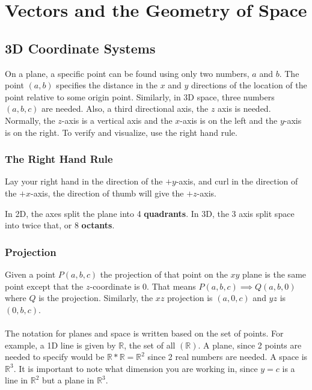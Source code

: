 \documentclass{article}
\begin{document}
\section{Vectors and the Geometry of Space}
\subsection{3D Coordinate Systems}
On a plane, a specific point can be found using only two numbers, $a$ and $b$. The point $(a,b)$ specifies the distance in the $x$ and $y$ directions of the location of the point relative to some origin point. Similarly, in 3D space, three numbers $(a,b,c)$ are needed. Also, a third directional axis, the $z$ axis is needed. Normally, the $z$-axis is a vertical axis and the $x$-axis is on the left and the $y$-axis is on the right. To verify and visualize, use the right hand rule.
\subsubsection{The Right Hand Rule}
Lay your right hand in the direction of the $+y$-axis, and curl in the direction of the $+x$-axis, the direction of thumb will give the $+z$-axis.

In 2D, the axes split the plane into 4 \textbf{quadrants}. In 3D, the 3 axis split space into twice that, or 8 \textbf{octants}.
\subsubsection{Projection}
Given a point $P(a,b,c)$ the projection of that point on the $xy$ plane is the same point except that the $z$-coordinate is 0. That means $P(a,b,c) \implies Q(a,b,0)$ where $Q$ is the projection. Similarly, the $xz$ projection is $(a,0,c)$ and $yz$ is $(0,b,c)$.\\\\
The notation for planes and space is written based on the set of points. For example, a 1D line is given by $\mathbb{R}$, the set of all $(\mathbb{R})$. A plane, since 2 points are needed to specify would be $\mathbb{R} * \mathbb{R} = \mathbb{R}^2$ since 2 real numbers are needed. A space is $\mathbb{R}^3$. It is important to note what dimension you are working in, since $y=c$ is a line in $\mathbb{R}^2$ but a plane in $\mathbb{R}^3$.
\end{document}
